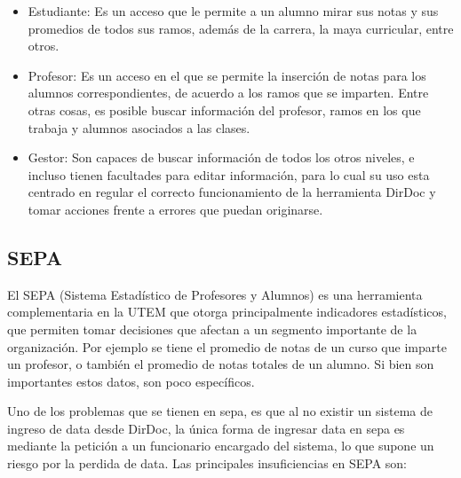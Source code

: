 \documentclass[a4paper,12pt,openany,oneside]{book}
\begin{document}
\begin{itemize}
	\item Estudiante: Es un acceso que le permite a un alumno mirar sus notas y sus promedios de todos sus ramos, además de la carrera, la maya curricular, entre otros.
	\item Profesor: Es un acceso en el que se permite la inserción de notas para los alumnos correspondientes, de acuerdo a los ramos que se imparten. Entre otras cosas, es posible buscar información del profesor, ramos en los que trabaja y alumnos asociados a las clases.
	\item Gestor: Son capaces de buscar información de todos los otros niveles, e incluso tienen facultades para editar información, para lo cual su uso esta centrado en regular el correcto funcionamiento de la herramienta DirDoc y tomar acciones frente a errores que puedan originarse.
\end{itemize}

\subsection{SEPA}
El SEPA (Sistema Estadístico de Profesores y Alumnos) es una herramienta complementaria en la UTEM que otorga principalmente indicadores estadísticos, que permiten tomar decisiones que afectan a un segmento importante de la organización. Por ejemplo se tiene el promedio de notas de un curso que imparte un profesor, o también el promedio de notas totales de un alumno. Si bien son importantes estos datos, son poco específicos.

Uno de los problemas que se tienen en sepa, es que al no existir un sistema de ingreso de data desde DirDoc, la única forma de ingresar data en sepa es mediante la petición a un funcionario encargado del sistema, lo que supone un riesgo por la perdida de data. Las principales insuficiencias en SEPA son:
\end{document}
